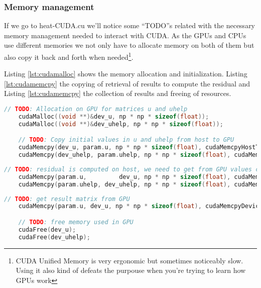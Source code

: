 \documentclass[a4paper, 10pt]{article}
\begin{document}
\subsubsection{Memory management}

If we go to heat-CUDA.cu we'll notice some ``TODO''s related with the necessary memory management needed to interact with CUDA. As the GPUs and CPUs use different memories we not only have to allocate memory on both of them but also copy it back and forth when needed\footnote{CUDA Unified Memory is very ergonomic but sometimes noticeably slow. Using it also kind of defeats the purpouse when you're trying to learn how GPUs work}.


Listing \ref{lst:cudamalloc} shows the memory allocation and initialization. Listing \ref{lst:cudamemcpy} the copying of
retrieval of results to compute the residual and Listing \ref{lst:cudamemcpy} the collection of results and freeing 
of resources.
\begin{lstlisting}[language=c, caption={Memory allocation and initialization}, label={lst:cudamalloc}]
    // TODO: Allocation on GPU for matrices u and uhelp
    cudaMalloc((void **)&dev_u, np * np * sizeof(float));
    cudaMalloc((void **)&dev_uhelp, np * np * sizeof(float));

    // TODO: Copy initial values in u and uhelp from host to GPU
    cudaMemcpy(dev_u, param.u, np * np * sizeof(float), cudaMemcpyHostToDevice);
    cudaMemcpy(dev_uhelp, param.uhelp, np * np * sizeof(float), cudaMemcpyHostToDevice);
\end{lstlisting}

\begin{lstlisting}[language=c, caption={Memory copying}, label={lst:cudamemcpy}]
    // TODO: residual is computed on host, we need to get from GPU values computed in u and uhelp
    cudaMemcpy(param.u,         dev_u, np * np * sizeof(float), cudaMemcpyDeviceToHost);
    cudaMemcpy(param.uhelp, dev_uhelp, np * np * sizeof(float), cudaMemcpyDeviceToHost);
\end{lstlisting}

\begin{lstlisting}[language=c, caption={Memory freeing and result retrieval}, label={lst:cudamemfree}]
    // TODO: get result matrix from GPU
    cudaMemcpy(param.u, dev_u, np * np * sizeof(float), cudaMemcpyDeviceToHost);

    // TODO: free memory used in GPU
    cudaFree(dev_u);
    cudaFree(dev_uhelp);
\end{lstlisting}
\end{document}
